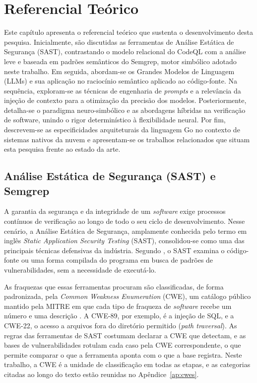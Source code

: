 \chapter[Referencial Teórico]{Referencial Teórico}
\label{cap:referencial}

Este capítulo apresenta o referencial teórico que sustenta o desenvolvimento desta pesquisa. Inicialmente, são discutidas as ferramentas de Análise Estática de Segurança (SAST), contrastando o modelo relacional do CodeQL com a análise leve e baseada em padrões semânticos do Semgrep, motor simbólico adotado neste trabalho. Em seguida, abordam-se os Grandes Modelos de Linguagem (LLMs) e sua aplicação no raciocínio semântico aplicado ao código-fonte. Na sequência, exploram-se as técnicas de engenharia de \textit{prompts} e a relevância da injeção de contexto para a otimização da precisão dos modelos. Posteriormente, detalha-se o paradigma neuro-simbólico e as abordagens híbridas na verificação de software, unindo o rigor determinístico à flexibilidade neural. Por fim, descrevem-se as especificidades arquiteturais da linguagem Go no contexto de sistemas nativos da nuvem e apresentam-se os trabalhos relacionados que situam esta pesquisa frente ao estado da arte. 

\section{Análise Estática de Segurança (SAST) e Semgrep}

A garantia da segurança e da integridade de um \textit{software} exige processos contínuos de verificação ao longo de todo o seu ciclo de desenvolvimento. Nesse cenário, a Análise Estática de Segurança, amplamente conhecida pelo termo em inglês \textit{Static Application Security Testing} (SAST), consolidou-se como uma das principais técnicas defensivas da indústria. Segundo , o SAST examina o código-fonte ou uma forma compilada do programa em busca de padrões de vulnerabilidades, sem a necessidade de executá-lo.

As fraquezas que essas ferramentas procuram são classificadas, de forma padronizada, pela \textit{Common Weakness Enumeration} (CWE), um catálogo público mantido pela MITRE em que cada tipo de fraqueza de \textit{software} recebe um número e uma descrição \cite{mitrecwe}. A CWE-89, por exemplo, é a injeção de SQL, e a CWE-22, o acesso a arquivos fora do diretório permitido (\textit{path traversal}). As regras das ferramentas de SAST costumam declarar a CWE que detectam, e as bases de vulnerabilidades rotulam cada caso pela CWE correspondente, o que permite comparar o que a ferramenta aponta com o que a base registra. Neste trabalho, a CWE é a unidade de classificação em todas as etapas, e as categorias citadas ao longo do texto estão reunidas no Apêndice~\ref{ap:cwes}.

